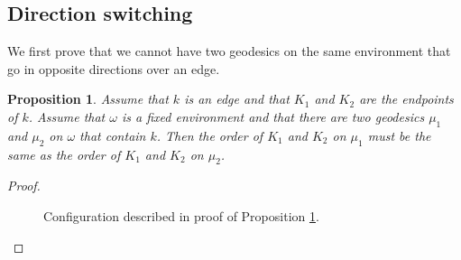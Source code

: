 \documentclass[reqno]{amsart}
\newtheorem{proposition}[theorem]{Proposition}
\begin{document}
 
 
\subsection{Direction switching}\label{subs|DSwitch}
We first prove that we cannot have two geodesics on the same environment that go in opposite directions over an edge.
\begin{proposition}\label{thm|DSwitchTrivial} Assume that $k$ is an edge and that $K_1$ and $K_2$ are the endpoints of $k$. Assume that $\omega$ is a fixed environment and that there are two geodesics $\mu_1$ and $\mu_2$ on $\omega$ that contain $k$. Then the order of $K_1$ and $K_2$ on $\mu_1$ must be the same as the order of $K_1$ and $K_2$ on $\mu_2$. \end{proposition}
\begin{proof}

 \begin{figure}[t]
 \centering
{}
\caption{Configuration described in proof of Proposition \ref{thm|DSwitchTrivial}.}
\label{fig|DSwitchingTrivial}
\end{figure}



\end{proof}
\end{document}
